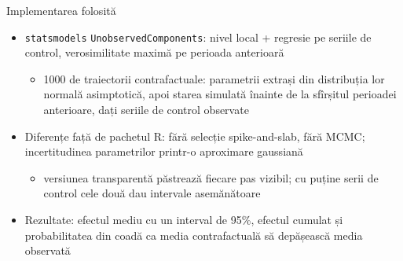 \begin{frame}{Implementarea folosită}
\itemsize{\small}
\begin{itemize}
    \item \texttt{statsmodels} \texttt{UnobservedComponents}: nivel local + regresie pe seriile de control, verosimilitate maximă pe perioada anterioară
    \begin{itemize}
        \item 1000 de traiectorii contrafactuale: parametrii extrași din distribuția lor normală asimptotică, apoi starea simulată înainte de la sfîrșitul perioadei anterioare, dați seriile de control observate
    \end{itemize}
    \item Diferențe față de pachetul R: fără selecție spike-and-slab, fără MCMC; incertitudinea parametrilor printr-o aproximare gaussiană
    \begin{itemize}
        \item versiunea transparentă păstrează fiecare pas vizibil; cu puține serii de control cele două dau intervale asemănătoare
    \end{itemize}
    \item Rezultate: efectul mediu cu un interval de 95\%, efectul cumulat și probabilitatea din coadă ca media contrafactuală să depășească media observată
\end{itemize}
\end{frame}

